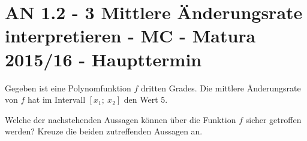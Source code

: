 \section{AN 1.2 - 3 Mittlere Änderungsrate interpretieren - MC - Matura 2015/16 - Haupttermin}

\begin{beispiel}[AN 1.2]{1} %
Gegeben ist eine Polynomfunktion $f$ dritten Grades. Die mittlere Änderungsrate von $f$ hat im Intervall $[x_1;~ x_2]$ den Wert 5. \leer

Welche der nachstehenden Aussagen können über die Funktion $f$ sicher getroffen werden?
Kreuze die beiden zutreffenden Aussagen an.

\end{beispiel}